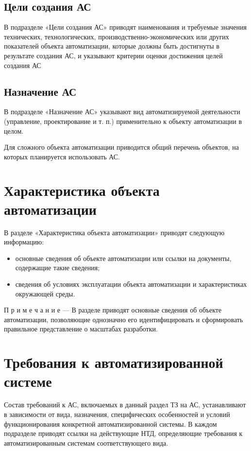 {\subsection{Цели создания АС}
В подразделе «Цели создания АС» приводят наименования и требуемые значения технических, технологических, производственно-экономических или других показателей объекта автоматизации, которые должны быть достигнуты в результате создания АС, и указывают критерии оценки достижения целей создания АС

\subsection{Назначение АС}
В подразделе «Назначение АС» указывают вид автоматизируемой деятельности (управление, проектирование и т. п.) применительно к объекту автоматизации в целом.

Для сложного объекта автоматизации приводится общий перечень объектов, на которых планируется использовать АС.
\section{Характеристика объекта автоматизации}
В разделе «Характеристика объекта автоматизации» приводят следующую информацию:
\begin{itemize}
  \item основные сведения об объекте автоматизации или ссылки на документы, содержащие такие сведения;
  \item сведения об условиях эксплуатации объекта автоматизации и характеристиках окружающей среды.
\end{itemize}
П р и м е ч а н и е — В разделе приводят основные сведения об объекте автоматизации, позволяющие однозначно его идентифицировать и сформировать правильное представление о масштабах разработки.

\section{Требования к автоматизированной системе}
Состав требований к АС, включаемых в данный раздел ТЗ на АС, устанавливают в зависимости от вида, назначения, специфических особенностей и условий функционирования конкретной автоматизированной системы. В каждом подразделе приводят ссылки на действующие НТД, определяющие требования к автоматизированным системам соответствующего вида.
}

